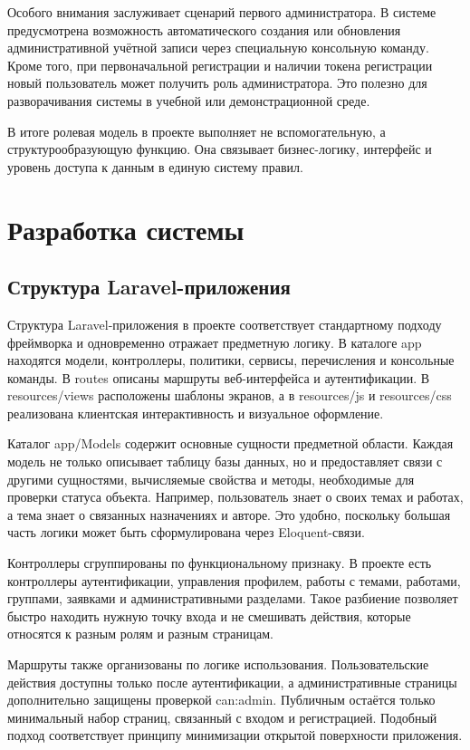 \documentclass[14pt,a4paper]{extreport}
\begin{document}
Особого внимания заслуживает сценарий первого администратора.
В системе предусмотрена возможность автоматического создания или обновления
административной учётной записи через специальную консольную команду.
Кроме того, при первоначальной регистрации и наличии токена регистрации
новый пользователь может получить роль администратора.
Это полезно для разворачивания системы в учебной или демонстрационной среде.

В итоге ролевая модель в проекте выполняет не вспомогательную, а
структурообразующую функцию.
Она связывает бизнес-логику, интерфейс и уровень доступа к данным в единую
систему правил.

\newpage
\chapter[Глава \thechapter. Разработка системы]{Разработка системы}

\section{Структура Laravel-приложения}

Структура Laravel-приложения в проекте соответствует стандартному подходу
фреймворка и одновременно отражает предметную логику.
В каталоге app находятся модели, контроллеры, политики, сервисы, перечисления
и консольные команды.
В routes описаны маршруты веб-интерфейса и аутентификации.
В resources/views расположены шаблоны экранов, а в resources/js и
resources/css реализована клиентская интерактивность и визуальное оформление.

Каталог app/Models содержит основные сущности предметной области.
Каждая модель не только описывает таблицу базы данных, но и предоставляет
связи с другими сущностями, вычисляемые свойства и методы, необходимые для
проверки статуса объекта.
Например, пользователь знает о своих темах и работах, а тема знает о
связанных назначениях и авторе.
Это удобно, поскольку большая часть логики может быть сформулирована через
Eloquent-связи.

Контроллеры сгруппированы по функциональному признаку.
В проекте есть контроллеры аутентификации, управления профилем, работы с
темами, работами, группами, заявками и административными разделами.
Такое разбиение позволяет быстро находить нужную точку входа и не смешивать
действия, которые относятся к разным ролям и разным страницам.

Маршруты также организованы по логике использования.
Пользовательские действия доступны только после аутентификации, а
административные страницы дополнительно защищены проверкой can:admin.
Публичным остаётся только минимальный набор страниц, связанный с входом и
регистрацией.
Подобный подход соответствует принципу минимизации открытой поверхности
приложения.
\end{document}
